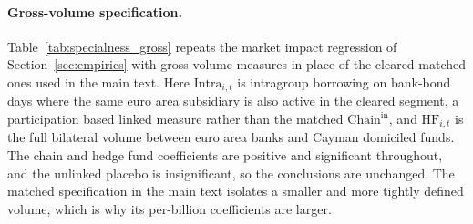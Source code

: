 \documentclass[english, 11pt, oneside, legal]{article}
\begin{document}
\clearpage
\paragraph{Gross-volume specification.} Table~\ref{tab:specialness_gross} repeats the market impact regression of Section~\ref{sec:empirics} with gross-volume measures in place of the cleared-matched ones used in the main text. Here $\text{Intra}_{i,t}$ is intragroup borrowing on bank-bond days where the same euro area subsidiary is also active in the cleared segment, a participation based linked measure rather than the matched $\text{Chain}^{\text{in}}$, and $\text{HF}_{i,t}$ is the full bilateral volume between euro area banks and Cayman domiciled funds. The chain and hedge fund coefficients are positive and significant throughout, and the unlinked placebo is insignificant, so the conclusions are unchanged. The matched specification in the main text isolates a smaller and more tightly defined volume, which is why its per-billion coefficients are larger.
\end{document}
